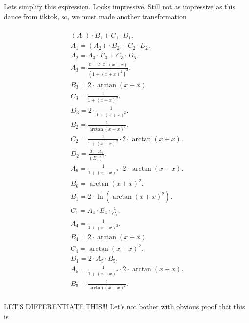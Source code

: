 \documentclass[12pt,a4paper]{extreport}
\begin{document}
Lets simplify this expression.
Looks impressive. Still not as impressive as this dance from tiktok\cite{Zolo}, so, we must made another transformation 

\begin{multline}
\\
(A_{1}) \cdot B_{1} + C_{1} \cdot D_{1}.\\
A_{1} = (A_{2}) \cdot B_{2} + C_{2} \cdot D_{2}.\\
A_{2} = A_{3} \cdot B_{3} + C_{3} \cdot D_{3}.\\
A_{3} = \frac{0 - 2 \cdot 2 \cdot (x + x)}{(1 + (x + x) ^ {2}) ^ {2}}.\\
B_{3} = 2 \cdot \arctan(x + x).\\
C_{3} = \frac{1}{1 + (x + x) ^ {2}}.\\
D_{3} = 2 \cdot \frac{1}{1 + (x + x) ^ {2}}.\\
B_{2} = \frac{1}{\arctan(x + x) ^ {2}}.\\
C_{2} = \frac{1}{1 + (x + x) ^ {2}} \cdot 2 \cdot \arctan(x + x).\\
D_{2} = \frac{0 - A_{6}}{(B_{6}) ^ {2}}.\\
A_{6} = \frac{1}{1 + (x + x) ^ {2}} \cdot 2 \cdot \arctan(x + x).\\
B_{6} = \arctan(x + x) ^ {2}.\\
B_{1} = 2 \cdot \ln(\arctan(x + x) ^ {2}).\\
C_{1} = A_{4} \cdot B_{4} \cdot \frac{1}{C_{4}}.\\
A_{4} = \frac{1}{1 + (x + x) ^ {2}}.\\
B_{4} = 2 \cdot \arctan(x + x).\\
C_{4} = \arctan(x + x) ^ {2}.\\
D_{1} = 2 \cdot A_{5} \cdot B_{5}.\\
A_{5} = \frac{1}{1 + (x + x) ^ {2}} \cdot 2 \cdot \arctan(x + x).\\
B_{5} = \frac{1}{\arctan(x + x) ^ {2}}.\\
\end{multline}


LET'S DIFFERENTIATE THIS!!!
Let's not bother with obvious proof that this is 
\end{document}
